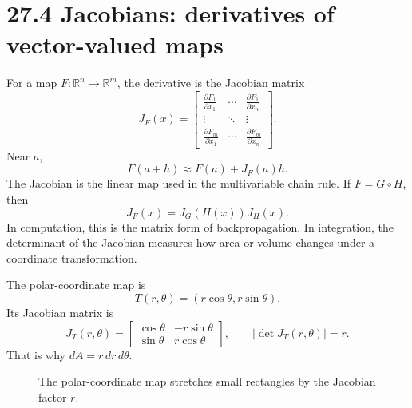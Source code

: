 \documentclass[11pt]{article}
\newcommand{\R}{\mathbb R}
\begin{document}
\section*{27.4 Jacobians: derivatives of vector-valued maps}

For a map $F:\R^n\to\R^m$, the derivative is the Jacobian matrix
\[
J_F(x)=
\begin{bmatrix}
\frac{\partial F_1}{\partial x_1} & \cdots & \frac{\partial F_1}{\partial x_n} \\
\vdots & \ddots & \vdots \\
\frac{\partial F_m}{\partial x_1} & \cdots & \frac{\partial F_m}{\partial x_n}
\end{bmatrix}.
\]
Near $a$,
\[
F(a+h)\approx F(a)+J_F(a)h.
\]
The Jacobian is the linear map used in the multivariable chain rule. If $F=G\circ H$, then
\[
J_F(x)=J_G(H(x))J_H(x).
\]
In computation, this is the matrix form of backpropagation. In integration, the determinant of the Jacobian measures how area or volume changes under a coordinate transformation.

\begin{examplebox}
The polar-coordinate map is
\[
T(r,\theta)=(r\cos\theta,r\sin\theta).
\]
Its Jacobian matrix is
\[
J_T(r,\theta)=
\begin{bmatrix}
\cos\theta & -r\sin\theta\\
\sin\theta & r\cos\theta
\end{bmatrix},
\qquad
|\det J_T(r,\theta)|=r.
\]
That is why $dA=r\,dr\,d\theta$.
\end{examplebox}

\begin{figure}[H]
\centering
{}
\caption{The polar-coordinate map stretches small rectangles by the Jacobian factor $r$.}
\end{figure}
\end{document}
